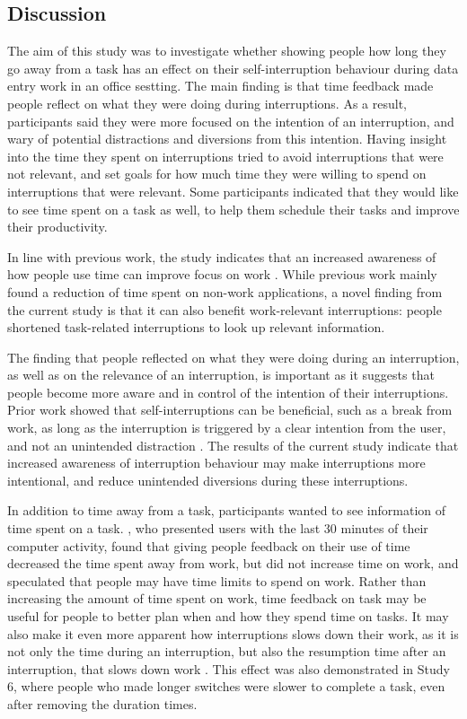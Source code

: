 \subsection{Discussion}
The aim of this study was to investigate whether showing people how long they go away from a task has an effect on their self-interruption behaviour during data entry work in an office sestting. The main finding is that time feedback made people reflect on what they were doing during interruptions. As a result, participants said they were more focused on the intention of an interruption, and wary of potential distractions and diversions from this intention. Having insight into the time they spent on interruptions tried to avoid interruptions that were not relevant, and set goals for how much time they were willing to spend on interruptions that were relevant. Some participants indicated that they would like to see time spent on a task as well, to help them schedule their tasks and improve their productivity. 

In line with previous work, the study indicates that an increased awareness of how people use time can improve focus on work \citep{Mark2018, Whittaker2016}. While previous work mainly found a reduction of time spent on non-work applications, a novel finding from the current study is that it can also benefit work-relevant interruptions: people shortened task-related interruptions to look up relevant information. 

The finding that people reflected on what they were doing during an interruption, as well as on the relevance of an interruption, is important as it suggests that people become more aware and in control of the intention of their interruptions. Prior work showed that self-interruptions can be beneficial, such as a break from work, as long as the interruption is triggered by a clear intention from the user, and not an unintended distraction \citep{Pang2016}. The results of the current study indicate that increased awareness of interruption behaviour may make interruptions more intentional, and reduce unintended diversions during these interruptions.

In addition to time away from a task, participants wanted to see information of time spent on a task. \citet{Whittaker2016}, who presented users with the last 30 minutes of their computer activity, found that giving people feedback on their use of time decreased the time spent away from work, but did not increase time on work, and speculated that people may have time limits to spend on work. Rather than increasing the amount of time spent on work, time feedback on task may be useful for people to better plan when and how they spend time on tasks. It may also make it even more apparent how interruptions slows down their work, as it is not only the time during an interruption, but also the resumption time after an interruption, that slows down work \citep{Altmann2004}. This effect was also demonstrated in Study 6, where people who made longer switches were slower to complete a task, even after removing the duration times. 

